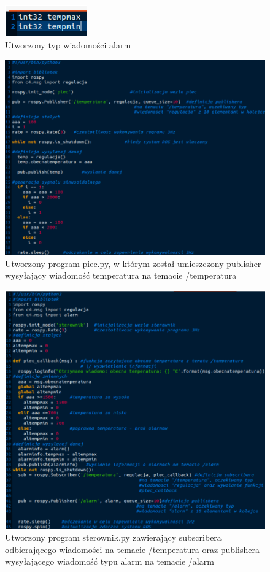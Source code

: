 \documentclass[10pt,a4paper,twoside,twocolumn]{article}%
\begin{document}
\begin{figure}[H]
    \centering
    \includegraphics[width=0.4\linewidth]{3.png}
    \caption{Utworzony typ wiadomości alarm}
\end{figure}

\begin{figure}[H]
    \centering
    \includegraphics[width=\linewidth]{4.png}
    \caption{Utworzony program piec.py, w którym został umieszczony
    publisher wysyłający wiadomość temperatura na temacie /temperatura}
\end{figure}

\begin{figure}[H]
    \centering
    \includegraphics[width=\linewidth]{5.png}
    \caption{Utworzony program sterownik\@.py zawierający subscribera
    odbierającego wiadomości na temacie /temperatura oraz publishera
    wysyłającego wiadomość typu alarm na temacie /alarm}
\end{figure}
\end{document}
